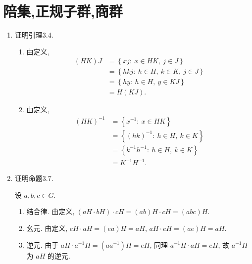 \section{陪集,正规子群,商群}
\begin{enumerate}
\item 证明引理3.4.
\begin{solution}
    \begin{enumerate}
        \item[(1)]
        由定义,
        \begin{align*}
            (HK)J &= \left\{ xj:\ x \in HK,\ j \in J \right\} \\
            &= \left\{ hkj:\ h \in H,\ k \in K,\ j \in J \right\} \\
            &= \left\{ hy:\ h \in H,\ y \in KJ \right\} \\
            &= H(KJ). 
        \end{align*}
        \item[(2)]
        由定义,
        \begin{align*}
            (HK)^{-1} &= \left\{ x^{-1}:\ x \in HK \right\} \\
            &= \left\{ (hk)^{-1}:\ h \in H,\ k \in K \right\} \\
            &= \left\{ k^{-1}h^{-1}:\ h \in H,\ k \in K \right\} \\
            &= K^{-1}H^{-1}. 
        \end{align*}
    \end{enumerate}
\end{solution}

\item 证明命题3.7.
\begin{solution}
    设 $a,b,c\in G$. \\
    \begin{enumerate}
        \item[(1)] 结合律.
        由定义,
        $\left( aH \cdot bH \right) \cdot cH = (ab)H \cdot cH = (abc)H$. 
        \item[(2)] 幺元.
        由定义, 
        $eH \cdot aH = (ea)H = aH$, $aH \cdot eH = (ae)H = aH$. 
        \item[(3)] 逆元.
        由于 $aH \cdot a^{-1}H = (a a^{-1})H = eH$,
        同理 $a^{-1}H \cdot aH = eH$,
        故 $a^{-1}H$ 为 $aH$ 的逆元. 
    \end{enumerate}
\end{solution}


\end{enumerate}
